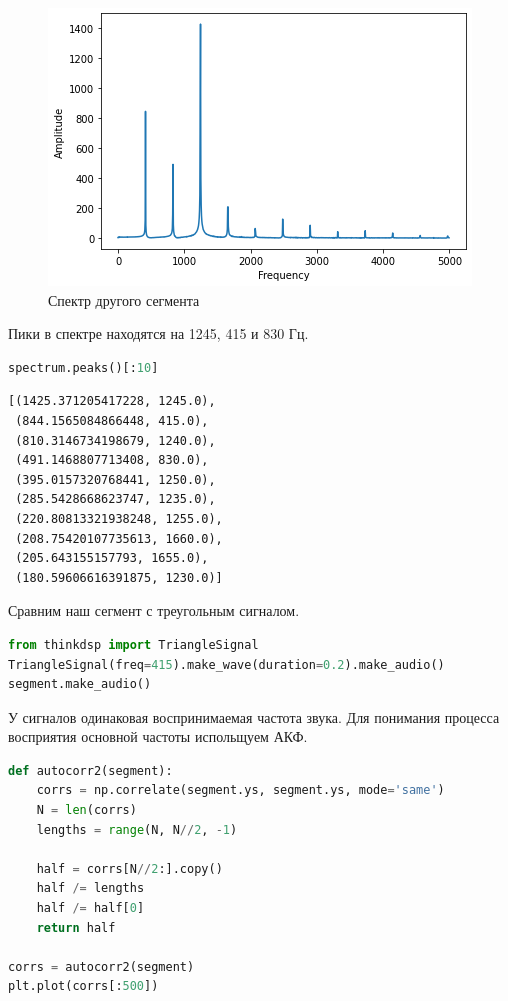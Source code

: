 \begin{figure}[H]
	\begin{center}
		\includegraphics[scale=1]{fig/lab05/lab5_8.png}
		\caption{Спектр другого сегмента}
	\end{center}
\end{figure}

Пики в спектре находятся на 1245, 415 и 830 Гц.

\begin{lstlisting}[language=Python]
spectrum.peaks()[:10]
\end{lstlisting}

\begin{lstlisting}
[(1425.371205417228, 1245.0),
 (844.1565084866448, 415.0),
 (810.3146734198679, 1240.0),
 (491.1468807713408, 830.0),
 (395.0157320768441, 1250.0),
 (285.5428668623747, 1235.0),
 (220.80813321938248, 1255.0),
 (208.75420107735613, 1660.0),
 (205.643155157793, 1655.0),
 (180.59606616391875, 1230.0)]
\end{lstlisting}

Сравним наш сегмент с треугольным сигналом.

\begin{lstlisting}[language=Python]
from thinkdsp import TriangleSignal
TriangleSignal(freq=415).make_wave(duration=0.2).make_audio()
segment.make_audio()
\end{lstlisting}

У сигналов одинаковая воспринимаемая частота звука. Для понимания процесса восприятия основной частоты испольщуем АКФ.

\begin{lstlisting}[language=Python]
def autocorr2(segment):
    corrs = np.correlate(segment.ys, segment.ys, mode='same')
    N = len(corrs)
    lengths = range(N, N//2, -1)

    half = corrs[N//2:].copy()
    half /= lengths
    half /= half[0]
    return half

corrs = autocorr2(segment)
plt.plot(corrs[:500])
\end{lstlisting}

